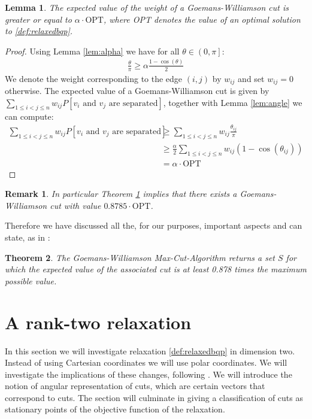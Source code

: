 \documentclass[12pt,a4paper]{article}
\theoremstyle{mythm}
\newtheorem{thm}{Theorem}[section]
\newtheorem{lem}[thm]{Lemma}
\newtheorem*{rem}{Remark}
\begin{document}
\begin{lem}
\label{lem:GWalgo} 
The expected value of the weight of a Goemans-Williamson cut is greater or equal to $ \alpha \cdot \text{OPT}  $, where OPT denotes the value of an optimal solution to
\ref{def:relaxedbqp}.
\end{lem} 
\begin{proof}
Using Lemma \ref{lem:alpha} we have for all $ \theta \in \left( 0, \pi  \right]   $:
\begin{align*}
\frac{ \theta }{ \pi  } \geq \alpha \frac{ 1 - \cos( \theta )  }{ 2 }  
\end{align*} 
We denote the weight corresponding to the edge $ \left( i,j \right)  $ by $ w _{ ij }  $ and set $ w _{ ij } = 0 $ otherwise.
The expected value of a Goemans-Williamson cut is given by \\ $ \sum_{ 1 \leq i < j \leq n    }^{  } w _{ ij }  P \left[ v_i \text{ and } v_j \text{ are separated}  \right]
$, together with Lemma \ref{lem:angle} we can compute:
\begin{align*}
 \sum_{ 1 \leq i < j \leq n    }^{  } w _{ ij }  P \left[ v_i \text{ and } v_j \text{ are separated}  \right]
& \geq \sum_{ 1 \leq i < j \leq n    }^{  } w _{ ij }  \frac{ \theta _{ ij }  }{ \pi } \\
&\geq \frac{ \alpha }{ 2 }  \sum_{ 1 \leq i < j \leq n    }^{  } w _{ ij }  \left( 1 - \cos( \theta _{ ij }  )  \right)  \\
&= \alpha \cdot \text{OPT} 
\end{align*} 
\end{proof}
\begin{rem}
In particular Theorem \ref{lem:GWalgo} implies that there exists a Goemans-Williamson cut with value $ 0.8785 \cdot \text{OPT} $.
\end{rem} 

Therefore we have discussed all the, for our purposes, important aspects and can state, as in \cite[Theorem 16.12]{Korte2018}:
\begin{thm}
The Goemans-Williamson  Max-Cut-Algorithm returns a set $ S $ for which the expected value of 
the associated cut is at least 0.878 times the maximum possible value.
\end{thm} 

\section{A rank-two relaxation} 
\label{rankTworelaxation} 
In this section we will investigate relaxation \ref{def:relaxedbqp} in dimension two.
Instead of using Cartesian coordinates we will use polar coordinates.
We will investigate the implications of these changes, following \cite[Sec. 3]{Burer2002}.
We will introduce the notion of angular representation of cuts, which are certain vectors that correspond to cuts.
The section will culminate in giving a classification of cuts as stationary points of the objective function of the relaxation.
\end{document}
